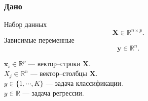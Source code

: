 \documentclass[pdf, 9pt, usenames, dvipsnames, unicode, hyperref={bookmarks=true,bookmarksopen=false, bookmarksnumbered}]{beamer}
\begin{document}

\begin{frame}\frametitle{Дано}

Набор данных
$$\textbf{X} \in \mathbb{R}^{n \times p}.$$
Зависимые переменные
$$\textbf{y} \in \mathbb{R}^n.$$

$\textbf{x}_i \in \mathbb{R}^p$ --- вектор--строки $\textbf{X}$.\\
$X_j \in \mathbb{R}^n$ --- вектор--столбцы $\textbf{X}.$\\

$y \in \{1, \cdots, K \}$ --- задача классификации.\\
$y \in \mathbb{R}$ --- задача регрессии.\\

\end{frame}

\end{document}
